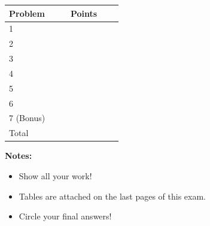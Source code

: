 \documentclass[11pt,fleqn,oneside]{book}
\begin{document}
\vspace{0.5cm}

{\large
\begin{center}
\begin{tabular}{|| l | c ||}
\hline
\hline
Problem & $\;\;\;\;\;\;$ Points $\;\;\;\;\;\;$ \\
\hline
\hline
1 & \\
\hline
2 & \\
\hline
3 & \\
\hline
4 & \\
\hline
5 & \\
\hline
6 & \\
\hline
7 (Bonus) & \\
\hline
\hline
Total & \\
\hline
\hline
\end{tabular}
\end{center}
}
\vspace{0.5cm}

\noindent \textbf{Notes:}
\begin{itemize}
\item Show all your work! 
\item Tables are attached on the last pages of this exam.
\item Circle your final answers!
\end{itemize}

\newpage
\end{document}
